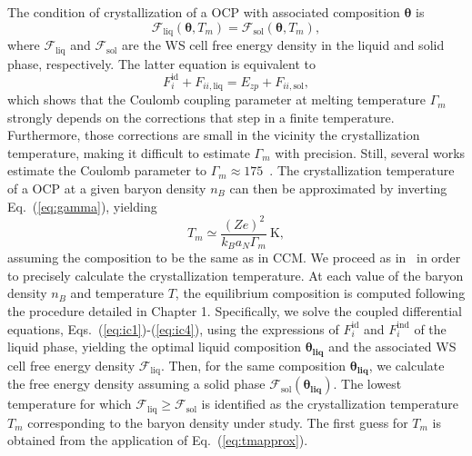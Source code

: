 The condition of crystallization of a OCP with associated composition 
$\bm{\theta}$ is 
%
\begin{equation}
  \mathcal{F}_{\text{liq}}(\bm{\theta}, T_m) 
  = \mathcal{F}_{\text{sol}}(\bm{\theta}, T_m),\label{eq:tmocp}
\end{equation}
%
where $\mathcal{F}_\text{liq}$ and $\mathcal{F}_\text{sol}$ are the WS cell
free energy density in the liquid and solid phase, respectively.
The latter equation is equivalent to
%
\begin{equation}
  F_i^{\text{id}} + F_{ii,\text{liq}} = E_{zp} + F_{ii,\text{sol}},
\end{equation}
%
which shows that the Coulomb coupling parameter at melting
temperature $\Gamma_m$ strongly depends on the corrections that step in a
finite temperature. Furthermore, those corrections are small in the vicinity
the crystallization temperature, making it difficult to estimate $\Gamma_m$
with precision. Still, several works estimate the Coulomb parameter to 
$\Gamma_m \approx 175$~\cite{VanHorn1969,Haensel2007}. 
The crystallization temperature of a OCP at a given baryon density $n_B$ 
can then be approximated by inverting Eq.~(\ref{eq:gamma}), yielding
%
\begin{equation}
  T_m \simeq \frac{(Ze)^2}{k_B a_N \Gamma_m} \ \text{K},\label{eq:tmapprox}
\end{equation}
%
assuming the composition to be the same as in CCM. 
%
We proceed as in~\cite{Fantina2020} in order to precisely calculate the 
crystallization temperature. At each value of the baryon density $n_B$ and 
temperature $T$, the equilibrium composition is computed following the 
procedure detailed in Chapter 1. Specifically, we solve the coupled 
differential equations, Eqs.~(\ref{eq:ic1})-(\ref{eq:ic4}), using the 
expressions of $F_{i}^{\text{id}}$ and $F_{i}^{\text{ind}}$ of the liquid 
phase, yielding the optimal liquid composition $\bm{\theta_{\text{liq}}}$ and 
the associated WS cell free energy density $\mathcal{F}_{\text{liq}}$. Then, 
for the same composition $\bm{\theta_{\text{liq}}}$, we calculate the free 
energy density assuming a solid phase 
$\mathcal{F}_{\text{sol}}(\bm{\theta_{\text{liq}}})$. The lowest temperature 
for which $\mathcal{F}_{\text{liq}} \geq \mathcal{F}_{\text{sol}}$ is 
identified as the crystallization temperature $T_m$ corresponding to the 
baryon density under study. The first guess for $T_m$ is obtained from the
application of Eq.~(\ref{eq:tmapprox}).

